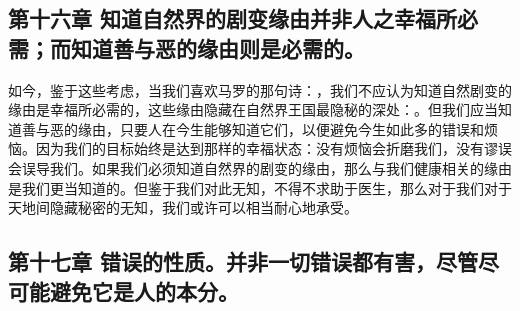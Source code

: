 
\subsection{第十六章 知道自然界的剧变缘由并非人之幸福所必需；而知道善与恶的缘由则是必需的。}

如今，鉴于这些考虑，当我们喜欢马罗的那句诗：，我们不应认为知道自然剧变的缘由是幸福所必需的，这些缘由隐藏在自然界王国最隐秘的深处：。但我们应当知道善与恶的缘由，只要人在今生能够知道它们，以便避免今生如此多的错误和烦恼。因为我们的目标始终是达到那样的幸福状态：没有烦恼会折磨我们，没有谬误会误导我们。如果我们必须知道自然界的剧变的缘由，那么与我们健康相关的缘由是我们更当知道的。但鉴于我们对此无知，不得不求助于医生，那么对于我们对于天地间隐藏秘密的无知，我们或许可以相当耐心地承受。\par


\subsection{第十七章 错误的性质。并非一切错误都有害，尽管尽可能避免它是人的本分。}

